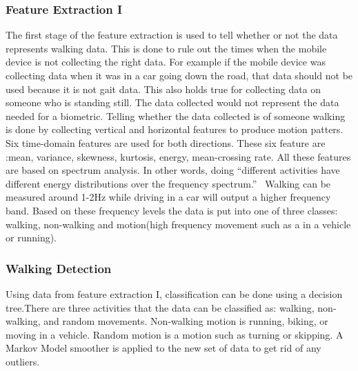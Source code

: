 \documentclass{sig-alternate}
\begin{document}
\subsubsection{Feature Extraction I}
	The first stage of the feature extraction is used to tell whether or not the data represents walking data. This is done to rule out the times when the mobile device is not collecting the right data. For example if the mobile device was collecting data when it was in a car going down the road, that data should not be used because it is not gait data. This also holds true for collecting data on someone who is standing still. The data collected would not represent the data needed for a biometric. Telling whether the data collected is of someone walking is done by collecting vertical and horizontal features to produce motion patters. Six time-domain features are used for both directions. These six feature are :mean, variance, skewness, kurtosis, energy, mean-crossing rate. All these features are based on spectrum analysis. In other words, doing ``different activities have different energy distributions over the frequency spectrum.''~\cite{Lu:2014} Walking can be measured around 1-2Hz while driving in a car will output a higher frequency band. Based on these frequency levels the data is put into one of three classes: walking, non-walking and motion(high frequency movement such as a in a vehicle or running).~\cite{Muaaz:2013}
\subsubsection{Walking Detection}
	Using data from feature extraction I, classification can be done using a decision tree.There are three activities that the data can be classified as: walking, non-walking, and random movements. Non-walking motion is running, biking, or moving in a vehicle. Random motion is a motion such as turning or skipping. A Markov Model smoother is applied to the new set of data to get rid of any outliers. 
\end{document}

